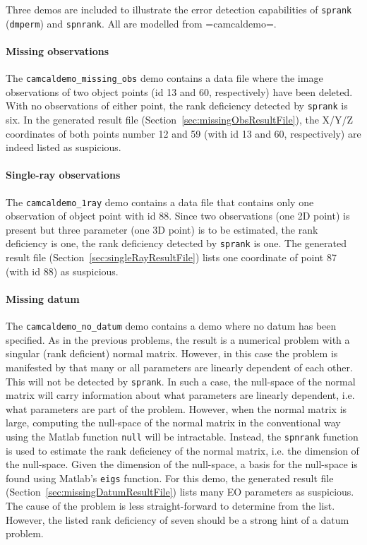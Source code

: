 \documentclass{article}
\begin{document}
Three demos are included to illustrate the error detection
capabilities of \texttt{sprank} (\texttt{dmperm}) and
\texttt{spnrank}. All are modelled from =camcaldemo=.

\paragraph{Missing observations}

The \texttt{camcaldemo\_missing\_obs} demo contains a data file where
the image observations of two object points (id 13 and 60,
respectively) have been deleted. With no observations of either point,
the rank deficiency detected by \texttt{sprank} is six. In the
generated result file (Section~\ref{sec:missingObsResultFile}), the
X/Y/Z coordinates of both points number 12 and 59 (with id 13 and 60,
respectively) are indeed listed as suspicious.

\paragraph{Single-ray observations}

The \texttt{camcaldemo\_1ray} demo contains a data file that contains
only one observation of object point with id 88. Since two
observations (one 2D point) is present but three parameter (one 3D
point) is to be estimated, the rank deficiency is one, the rank
deficiency detected by \texttt{sprank} is one. The generated result
file (Section~\ref{sec:singleRayResultFile}) lists one coordinate of
point 87 (with id 88) as suspicious.

\paragraph{Missing datum}

The \texttt{camcaldemo\_no\_datum} demo contains a demo where no datum
has been specified. As in the previous problems, the result is a
numerical problem with a singular (rank deficient) normal matrix.
However, in this case the problem is manifested by that many or all
parameters are linearly dependent of each other. This will not be
detected by \texttt{sprank}. In such a case, the null-space of the
normal matrix will carry information about what parameters are
linearly dependent, i.e. what parameters are part of the problem.
However, when the normal matrix is large, computing the null-space of
the normal matrix in the conventional way using the Matlab function
\texttt{null} will be intractable. Instead, the \texttt{spnrank}
\citep{Foster2009:Calculating} function is used to estimate the rank
deficiency of the normal matrix, i.e. the dimension of the null-space.
Given the dimension of the null-space, a basis for the null-space is
found using Matlab's \texttt{eigs} function. For this demo, the
generated result file (Section~\ref{sec:missingDatumResultFile}) lists
many EO parameters as suspicious. The cause of the problem is less
straight-forward to determine from the list. However, the listed rank
deficiency of seven should be a strong hint of a datum problem.
\end{document}
